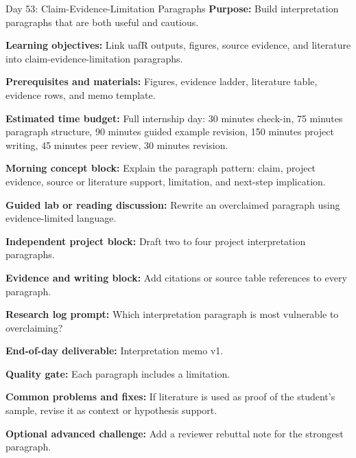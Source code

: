 \begin{dailybox}{Day 53: Claim-Evidence-Limitation Paragraphs}
\textbf{Purpose:} Build interpretation paragraphs that are both useful and cautious.

\textbf{Learning objectives:} Link uafR outputs, figures, source evidence, and literature into claim-evidence-limitation paragraphs.

\textbf{Prerequisites and materials:} Figures, evidence ladder, literature table, evidence rows, and memo template.

\textbf{Estimated time budget:} Full internship day: 30 minutes check-in, 75 minutes paragraph structure, 90 minutes guided example revision, 150 minutes project writing, 45 minutes peer review, 30 minutes revision.

\textbf{Morning concept block:} Explain the paragraph pattern: claim, project evidence, source or literature support, limitation, and next-step implication.

\textbf{Guided lab or reading discussion:} Rewrite an overclaimed paragraph using evidence-limited language.

\textbf{Independent project block:} Draft two to four project interpretation paragraphs.

\textbf{Evidence and writing block:} Add citations or source table references to every paragraph.

\textbf{Research log prompt:} Which interpretation paragraph is most vulnerable to overclaiming?

\textbf{End-of-day deliverable:} Interpretation memo v1.

\textbf{Quality gate:} Each paragraph includes a limitation.

\textbf{Common problems and fixes:} If literature is used as proof of the student's sample, revise it as context or hypothesis support.

\textbf{Optional advanced challenge:} Add a reviewer rebuttal note for the strongest paragraph.
\end{dailybox}

